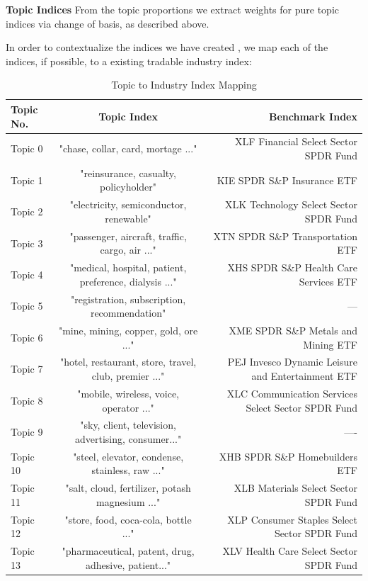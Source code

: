 \documentclass[12pt,journal,letterpaper,oneside,onecolumn]{IEEEtran}
\begin{document}
\textbf{Topic Indices}
From the topic proportions we extract weights for pure topic indices via change of basis, as described above.

In order to contextualize the indices we have created , we map each of the indices, if possible, to a existing tradable industry index:

\begin{table}[!ht]
  \begin{center}
    \caption{Topic to Industry Index Mapping}
    \begin{tabular}{l|c|r}
      \textbf{Topic No.} & \textbf{Topic Index} & \textbf{Benchmark Index}\\
      \hline
      Topic 0 & "chase, collar, card, mortage ..." & XLF Financial Select Sector SPDR Fund \\
      Topic 1 & "reinsurance, casualty, policyholder" & KIE SPDR S\&P Insurance ETF \\
      Topic 2 & "electricity, semiconductor, renewable" & XLK Technology Select Sector SPDR Fund \\
      Topic 3 & "passenger, aircraft, traffic, cargo, air ..." & XTN SPDR S\&P Transportation ETF\\
      Topic 4 & "medical, hospital, patient, preference, dialysis ..." & XHS SPDR S\&P Health Care Services ETF \\
      Topic 5 & "registration, subscription, recommendation" & --- \\
      Topic 6 & "mine, mining, copper, gold, ore ..." & XME SPDR S\&P Metals and Mining ETF \\
      Topic 7 & "hotel, restaurant, store, travel, club, premier ..." & PEJ Invesco Dynamic Leisure and Entertainment ETF \\
      Topic 8 & "mobile, wireless, voice, operator ..." & XLC Communication Services Select Sector SPDR Fund \\
      Topic 9 & "sky, client, television, advertising, consumer..." & ---- \\
      Topic 10 & "steel, elevator, condense, stainless, raw ..." & XHB SPDR S\&P Homebuilders ETF \\
      Topic 11 & "salt, cloud, fertilizer, potash magnesium ..." & XLB Materials Select Sector SPDR Fund \\
      Topic 12 & "store, food, coca-cola, bottle ..." & XLP Consumer Staples Select Sector SPDR Fund \\
      Topic 13 & "pharmaceutical, patent, drug, adhesive, patient..." & XLV Health Care Select Sector SPDR Fund \\

\end{tabular}
\end{center}
\end{table}
\end{document}
